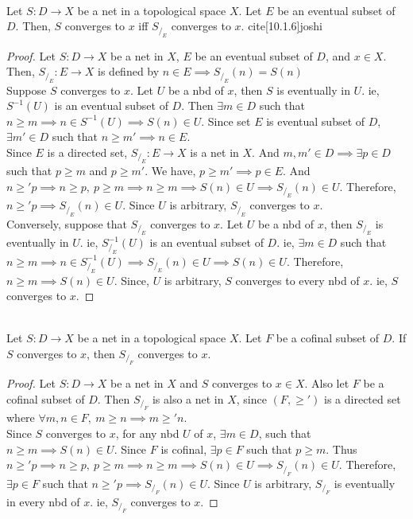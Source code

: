 \begin{proposition}\cite[10.1.6]{joshi}\\
	Let $S : D \to X$ be a net in a topological space $X$.
	Let $E$ be an eventual subset of $D$.
	Then, $S$ converges to $x$ iff $S_{/_E}$ converges to $x$.
	cite[10.1.6]{joshi}
\end{proposition}
\begin{proof}
	Let $S : D \to X$ be a net in $X$, $E$ be an eventual subset of $D$, and $x \in X$.
	Then, $S_{/_E} : E \to X$ is defined by $n \in E \implies S_{/_E}(n) = S(n)$\\
	
	Suppose $S$ converges to $x$.
	Let $U$ be a nbd of $x$, then $S$ is eventually in $U$.
	ie, $S^{-1}(U)$ is an eventual subset of $D$.
	Then $\exists m \in D$ such that $n \ge m \implies n \in S^{-1}(U) \implies S(n) \in U$.
	Since set $E$ is eventual subset of $D$, $\exists m' \in D$ such that $n \ge m' \implies n \in E$.\\
	
	Since $E$ is a directed set, $S_{/_E} : E \to X$ is a net in $X$.
	And $m,m' \in D \implies \exists p \in D$ such that $p \ge m$ and $p \ge m'$.
	We have, $p \ge m' \implies p \in E$.
	And $n \ge' p \implies n \ge p,\ p \ge m \implies n \ge m \implies S(n) \in U \implies S_{/_E}(n) \in U$.
	Therefore, $n \ge' p \implies S_{/_E}(n) \in U$.
	Since $U$ is arbitrary, $S_{/_E}$ converges to $x$.\\


	Conversely, suppose that $S_{/_E}$ converges to $x$.
	Let $U$ be a nbd of $x$, then $S_{/_E}$ is eventually in $U$.
	ie, $S_{/_E}^{-1}(U)$ is an eventual subset of $D$.
	ie, $\exists m \in D$ such that $n \ge m \implies n \in S_{/_E}^{-1}(U) \implies S_{/_E}(n) \in U \implies S(n) \in U$.
	Therefore, $n \ge m \implies S(n) \in U$.
	Since, $U$ is arbitrary, $S$ converges to every nbd of $x$.
	ie, $S$ converges to $x$.
\end{proof}

\begin{proposition}\cite[10.1.8]{joshi}\\
	Let $S : D \to X$ be a net in a topological space $X$.
	Let $F$ be a cofinal subset of $D$.
	If $S$ converges to $x$, then $S_{/_F}$ converges to $x$.
\end{proposition}
\begin{proof}
	Let $S : D \to X$ be a net in $X$ and $S$ converges to $x \in X$.
	Also let $F$ be a cofinal subset of $D$.
	Then $S_{/_F}$ is also a net in $X$, since $(F,\ge')$ is a directed set where $\forall m,n \in F,\ m \ge n \implies m \ge' n$.\\

	Since $S$ converges to $x$, for any nbd $U$ of $x$, $\exists m \in D$, such that $n \ge m \implies S(n) \in U$.
	Since $F$ is cofinal, $\exists p \in F$ such that $p \ge m$.
	Thus $n \ge' p \implies n \ge p,\ p \ge m \implies n \ge m \implies S(n) \in U \implies S_{/_F}(n) \in U$.
	Therefore, $\exists p \in F$ such that $n \ge' p \implies S_{/_F}(n) \in U$.
	Since $U$ is arbitrary, $S_{/_F}$ is eventually in every nbd of $x$.
	ie, $S_{/_F}$ converges to $x$.
\end{proof}

